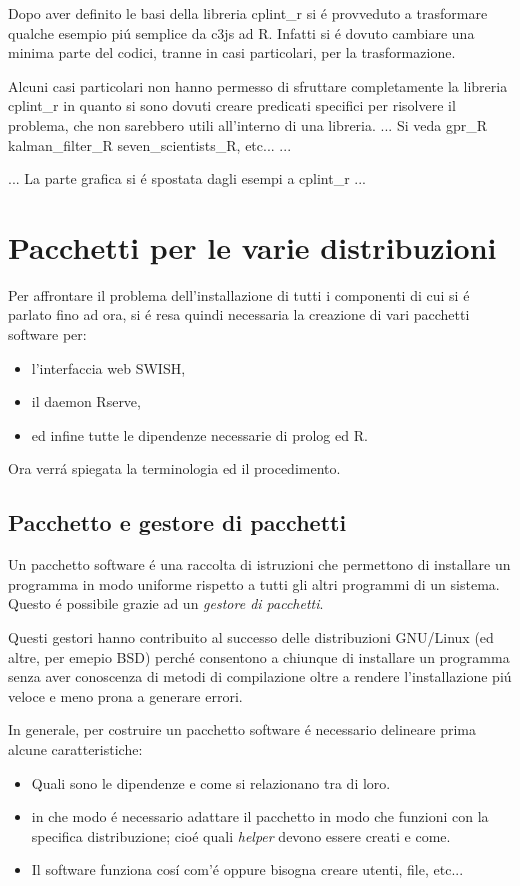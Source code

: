 \documentclass[10pt,titlepage,twoside,a4paper]{report}
\begin{document}
Dopo aver definito le basi della libreria cplint\_r si \'e provveduto a 
trasformare qualche esempio pi\'u semplice da c3js ad R. Infatti si \'e 
dovuto cambiare una minima parte del codici, tranne in casi particolari, per la 
trasformazione.

Alcuni casi particolari non hanno permesso di sfruttare completamente la 
libreria cplint\_r in quanto si sono dovuti creare predicati specifici per 
risolvere il problema, che non sarebbero utili all'interno di una libreria. 
... Si veda gpr\_R kalman\_filter\_R seven\_scientists\_R, etc... ...


... La parte grafica si \'e spostata dagli esempi a cplint\_r ...



\chapter{Pacchetti per le varie distribuzioni} 
\label{ch:pacchetti-per-le-varie-distribuzioni}
Per affrontare il problema dell'installazione di tutti i componenti di cui si 
\'e parlato fino ad ora, si \'e resa quindi necessaria la creazione di vari 
pacchetti software per:
\begin{itemize}
    \item l'interfaccia web SWISH,
    \item il daemon Rserve,
    \item ed infine tutte le dipendenze necessarie di prolog ed R.
\end{itemize}

Ora verr\'a spiegata la terminologia ed il procedimento.

\section{Pacchetto e gestore di pacchetti} \label{pacchetto-e-gestore-di-pacchetti}
Un pacchetto software \'e una raccolta di istruzioni che permettono di 
installare un programma in modo uniforme rispetto a tutti gli altri programmi 
di un sistema. Questo \'e possibile grazie ad un \emph{gestore di 
pacchetti}.

Questi gestori hanno contribuito al successo delle distribuzioni GNU/Linux (ed 
altre, per emepio BSD) perch\'e consentono a chiunque di installare un 
programma senza aver conoscenza di metodi di compilazione oltre a rendere 
l'installazione pi\'u veloce e meno prona a generare errori.

In generale, per costruire un pacchetto software \'e necessario delineare prima 
alcune caratteristiche:
\begin{itemize}
    \item Quali sono le dipendenze e come si relazionano tra di loro.
    \item in che modo \'e necessario adattare il pacchetto in modo che funzioni 
          con la specifica distribuzione; cio\'e quali \emph{helper} devono 
essere creati e come.
    \item Il software funziona cos\'i com'\'e oppure bisogna creare utenti, 
file, etc...
\end{itemize}
\end{document}
